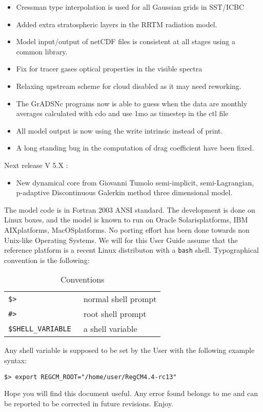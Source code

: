 \begin{itemize}
  \item Cressman type interpolation is used for all Gaussian grids in SST/ICBC
  \item Added extra stratospheric layers in the RRTM radiation model.
  \item Model input/output of netCDF files is consistent at all stages using a
   common library.
  \item Fix for tracer gases optical properties in the visible spectra
  \item Relaxing upstream scheme for cloud disabled as it may need reworking.
  \item The GrADSNc programs now is able to guess when the data are monthly
    averages calculated with cdo and use 1mo as timestep in the ctl file
  \item All model output is now using the write intrinsic instead of print.
  \item A long standing bug in the computation of drag coefficient have
    been fixed.
\end{itemize}

Next release V 5.X :

\begin{itemize}
  \item New dynamical core from Giovanni Tumolo semi-implicit, semi-Lagrangian,
   p-adaptive Discontinuous Galerkin method three dimensional model.
\end{itemize}

The model code is in Fortran 2003 ANSI standard.
The development is done on Linux boxes, and the model is known to run
on Oracle Solaris\texttrademark platforms, IBM AIX\texttrademark platforms,
MacOS\texttrademark platforms.
No porting effort has been done towards non Unix-like Operating Systems.
We will for this User Guide assume that the reference platform is a recent
Linux distributon with a \verb=bash= shell.
Typographical convention is the following:

\begin{table}[ht]
\caption{Conventions}
\vspace{0.05 in}
\centering
\begin{tabular}{l|l}
\hline
\verb=$> = & normal shell prompt \\
\verb=#> = & root shell prompt \\
\verb=$SHELL_VARIABLE = & a shell variable \\
\hline
\end{tabular}
\label{conventions}
\end{table}

Any shell variable is supposed to be set by the User with the following example
syntax:

\begin{Verbatim}
$> export REGCM_ROOT="/home/user/RegCM4.4-rc13"
\end{Verbatim}

Hope you will find this document useful. Any error found belongs to me and can
be reported to be corrected in future revisions. Enjoy.
